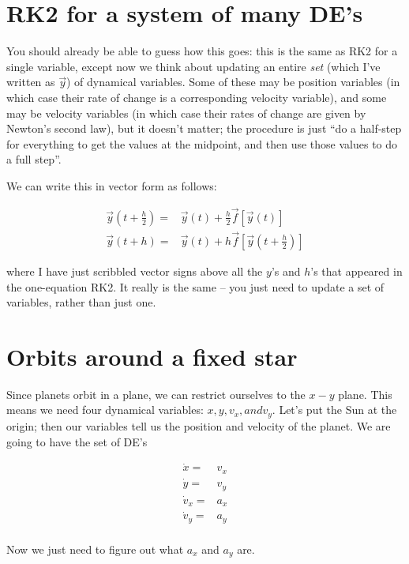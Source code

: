 \documentclass[12ampt]{article}
\begin{document}
\section {RK2 for a system of many DE's}

You should already be able to guess how this goes: this is the same as RK2 for a single variable, except now we think about updating an entire {\it set} (which I've written as $\vec y$)  of dynamical variables. Some of these may be position variables 
(in which case their rate of change is a corresponding velocity variable), and some may be velocity variables (in which case their rates of change are given by Newton's second law), but it doesn't matter; the procedure is just ``do a half-step
for everything to get the values at the midpoint, and then use those values to do a full step''. 

We can write this in vector form as follows:

\begin{align}
    \vec y(t+\frac{h}{2}) =& \vec y(t) + \frac{h}{2} \vec f\left[\vec y\left(t\right)\right] \\
    \vec y(t+h) =& \vec y(t) + h \vec f\left[\vec y\left(t+\frac{h}{2}\right)\right]
\end{align}

where I have just scribbled vector signs above all the $y$'s and $h$'s that appeared in the one-equation RK2. It really is the same -- you just need to update a set of variables, rather than just one.

\section{Orbits around a fixed star}

Since planets orbit in a plane, we can restrict ourselves to the $x-y$ plane. This means we need four dynamical variables: $x, y, v_x, and v_y$. Let's put the Sun at the origin; then our variables tell us the position and velocity 
of the planet. We are going to have the set of DE's

\begin{align}
  \dot x =& v_x \\
  \dot y =& v_y \\
  \dot v_x =& a_x \\
  \dot v_y =& a_y \\
\end{align}

Now we just need to figure out what $a_x$ and $a_y$ are.
\end{document}
